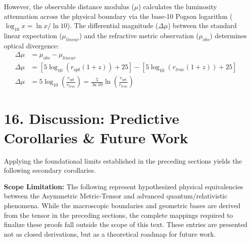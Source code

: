 However, the observable distance modulus ($\mu$) calculates the luminosity attenuation across the physical boundary via the base-10 Pogson logarithm ($\log_{10} x = \ln x / \ln 10$). The differential magnitude ($\Delta\mu$) between the standard linear expectation ($\mu_{linear}$) and the refractive metric observation ($\mu_{obs}$) determines optical divergence: %
\begin{align}
    \Delta\mu &= \mu_{obs} - \mu_{linear} \nonumber \\
    \Delta\mu &= \left[ 5 \log_{10}(r_{opt}(1+z)) + 25 \right] - \left[ 5 \log_{10}(r_{true}(1+z)) + 25 \right] \nonumber \\
    \Delta\mu &= 5 \log_{10} \left( \frac{r_{opt}}{r_{true}} \right) = \frac{5}{\ln 10} \ln \left( \frac{r_{opt}}{r_{true}} \right)
\end{align}

\section*{16. Discussion: Predictive Corollaries \& Future Work}
Applying the foundational limits established in the preceding sections yields the following secondary corollaries. 

\textbf{Scope Limitation:} The following represent hypothesized physical equivalencies between the Asymmetric Metric-Tensor and advanced quantum/relativistic phenomena. While the macroscopic boundaries and geometric bases are derived from the tensor in the preceding sections, the complete mappings required to finalize these proofs fall outside the scope of this text. These entries are presented not as closed derivations, but as a theoretical roadmap for future work. 



